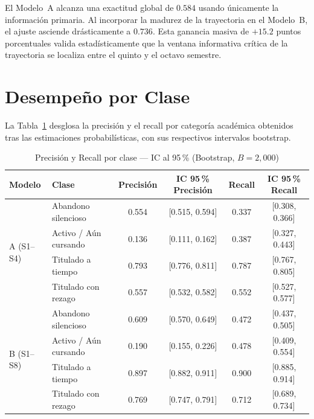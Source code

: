 \noindent
El Modelo~A alcanza una exactitud global de $0.584$ usando únicamente la información primaria.
Al incorporar la madurez de la trayectoria en el Modelo~B, el ajuste asciende drásticamente a
$0.736$. Esta ganancia masiva de $+15.2$ puntos porcentuales valida estadísticamente que la
ventana informativa crítica de la trayectoria se localiza entre el quinto y el octavo semestre.

\section{Desempeño por Clase}

La Tabla~\ref{tab:rf_clases} desglosa la precisión y el recall por categoría académica
obtenidos tras las estimaciones probabilísticas, con sus respectivos intervalos bootstrap.

\begin{table}[H]
\centering
\caption{Precisión y Recall por clase — IC al 95\,\% (Bootstrap, $B=2{,}000$)}
\label{tab:rf_clases}
\scriptsize
\setlength{\tabcolsep}{4pt}
\begin{tabular}{llcccc}
\toprule
\textbf{Modelo} & \textbf{Clase} & \textbf{Precisión} & \textbf{IC 95\,\% Precisión} & \textbf{Recall} & \textbf{IC 95\,\% Recall} \\
\midrule
\multirow{4}{*}{A (S1–S4)}
 & Abandono silencioso & 0.554 & [0.515, 0.594] & 0.337 & [0.308, 0.366] \\
 & Activo / Aún cursando & 0.136 & [0.111, 0.162] & 0.387 & [0.327, 0.443] \\
 & Titulado a tiempo & 0.793 & [0.776, 0.811] & 0.787 & [0.767, 0.805] \\
 & Titulado con rezago & 0.557 & [0.532, 0.582] & 0.552 & [0.527, 0.577] \\
\midrule
\multirow{4}{*}{B (S1–S8)}
 & Abandono silencioso & 0.609 & [0.570, 0.649] & 0.472 & [0.437, 0.505] \\
 & Activo / Aún cursando & 0.190 & [0.155, 0.226] & 0.478 & [0.409, 0.554] \\
 & Titulado a tiempo & 0.897 & [0.882, 0.911] & 0.900 & [0.885, 0.914] \\
 & Titulado con rezago & 0.769 & [0.747, 0.791] & 0.712 & [0.689, 0.734] \\
\bottomrule
\end{tabular}
\end{table}

